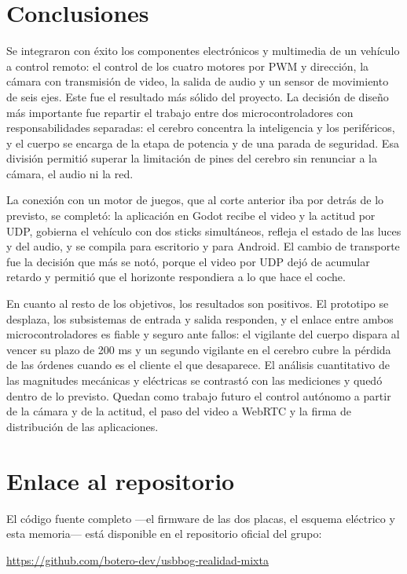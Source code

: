 \documentclass[journal]{IEEEtran}
\begin{document}
\section{Conclusiones}
Se integraron con éxito los componentes electrónicos y multimedia de un vehículo a control remoto: el control de los cuatro motores por PWM y dirección, la cámara con transmisión de video, la salida de audio y un sensor de movimiento de seis ejes. Este fue el resultado más sólido del proyecto. La decisión de diseño más importante fue repartir el trabajo entre dos microcontroladores con responsabilidades separadas: el cerebro concentra la inteligencia y los periféricos, y el cuerpo se encarga de la etapa de potencia y de una parada de seguridad. Esa división permitió superar la limitación de pines del cerebro sin renunciar a la cámara, el audio ni la red.

La conexión con un motor de juegos, que al corte anterior iba por detrás de lo previsto, se completó: la aplicación en Godot recibe el video y la actitud por UDP, gobierna el vehículo con dos sticks simultáneos, refleja el estado de las luces y del audio, y se compila para escritorio y para Android. El cambio de transporte fue la decisión que más se notó, porque el video por UDP dejó de acumular retardo y permitió que el horizonte respondiera a lo que hace el coche.

En cuanto al resto de los objetivos, los resultados son positivos. El prototipo se desplaza, los subsistemas de entrada y salida responden, y el enlace entre ambos microcontroladores es fiable y seguro ante fallos: el vigilante del cuerpo dispara al vencer su plazo de 200 ms y un segundo vigilante en el cerebro cubre la pérdida de las órdenes cuando es el cliente el que desaparece. El análisis cuantitativo de las magnitudes mecánicas y eléctricas se contrastó con las mediciones y quedó dentro de lo previsto. Quedan como trabajo futuro el control autónomo a partir de la cámara y de la actitud, el paso del video a WebRTC y la firma de distribución de las aplicaciones.

\section{Enlace al repositorio}

El código fuente completo ---el firmware de las dos placas, el esquema eléctrico y esta memoria--- está disponible en el repositorio oficial del grupo:

\begin{center}
\url{https://github.com/botero-dev/usbbog-realidad-mixta}
\end{center}
\end{document}
